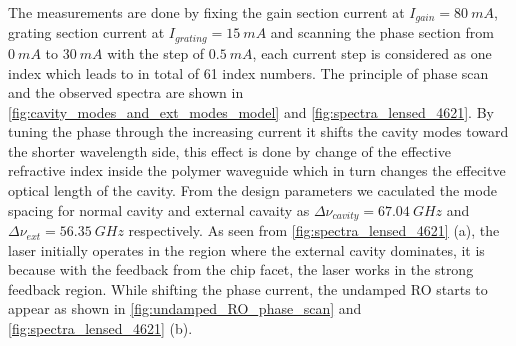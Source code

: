 The measurements are done by fixing the gain section current at $I_{gain}=80 \ mA$, grating section current at $I_{grating}=15 \ mA$ and scanning the phase section from $0 \ mA$ to $30 \ mA$ with the step of $0.5 \ mA$, each current step is considered as one index which leads to in total of 61 index numbers. The principle of phase scan and the observed spectra are shown in \autoref{fig:cavity_modes_and_ext_modes_model} and \autoref{fig:spectra_lensed_4621}. By tuning the phase through the increasing current it shifts the cavity modes toward the shorter wavelength side, this effect is done by change of the effective refractive index inside the polymer waveguide which in turn changes the effecitve optical length of the cavity. From the design parameters we caculated the mode spacing for normal cavity and external cavaity as $\Delta\nu_{cavity}=67.04 \ GHz$ and $\Delta\nu_{ext}=56.35 \ GHz$ respectively. As seen from \autoref{fig:spectra_lensed_4621} (a), the laser initially operates in the region where the external cavity dominates, it is because with the feedback from the chip facet, the laser works in the strong feedback region. While shifting the phase current, the undamped RO starts to appear as shown in \autoref{fig:undamped_RO_phase_scan} and \autoref{fig:spectra_lensed_4621} (b).

